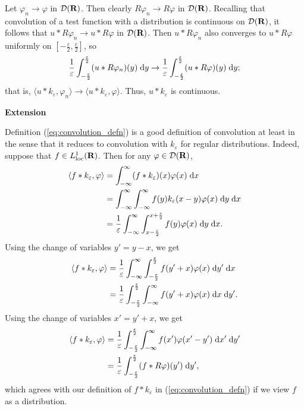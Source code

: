 \documentclass{homework}
\begin{document}
	Let $\varphi_n \to \varphi$ in $\mathcal{D}(\textnormal{\bf R})$. Then clearly $R\varphi_n \to R\varphi$ in $\mathcal{D}(\textnormal{\bf R})$. Recalling that convolution of a test function with a distribution is continuous on $\mathcal{D}(\textnormal{\bf R})$, it follows that $u * R\varphi_n \to u * R\varphi$ in $\mathcal{D}(\textnormal{\bf R})$. Then $u*R\varphi_n$ also converges to $u *R\varphi$ uniformly on $\left[-\frac{\varepsilon}{2}, \frac{\varepsilon}{2}\right]$, so
	\begin{equation}
		\frac{1}{\varepsilon}\int_{-\frac{\varepsilon}{2}}^\frac{\varepsilon}{2}(u*R\varphi_n)(y)\;\text{d} y \to 
		\frac{1}{\varepsilon}\int_{-\frac{\varepsilon}{2}}^\frac{\varepsilon}{2}(u*R\varphi)(y)\;\text{d} y;
	\end{equation}
	that is, $\langle u * k_\varepsilon, \varphi_n\rangle \to \langle u*k_\varepsilon, \varphi\rangle$. Thus, $u*k_\varepsilon$ is continuous.
	
	\textbf{Extension}
	
	Definition (\ref{eq:convolution_defn}) is a good definition of convolution at least in the sense that it reduces to convolution with $k_\varepsilon$ for regular distributions. Indeed, suppose that $f \in L^1_\text{loc}(\textnormal{\bf R})$. Then for any $\varphi \in \mathcal{D}(\textnormal{\bf R})$,
	\begin{align}
		\langle f * k_\varepsilon, \varphi\rangle &= \int_{-\infty}^\infty (f * k_\varepsilon)(x) \varphi(x) \;\text{d} x \\
		&= \int_{-\infty}^\infty \int_{-\infty}^\infty f(y) k_\varepsilon(x-y) \varphi(x)\;\text{d} y \;\text{d} x \\
		&= \frac{1}{\varepsilon}\int_{-\infty}^\infty \int_{x-\frac{\varepsilon}{2}}^{x+\frac{\varepsilon}{2}} f(y)\varphi(x)\;\text{d} y \;\text{d} x.
	\end{align}
	Using the change of variables $y' = y - x$, we get
	\begin{align}
			\langle f * k_\varepsilon, \varphi\rangle &= \frac{1}{\varepsilon}\int_{-\infty}^\infty \int_{-\frac{\varepsilon}{2}}^\frac{\varepsilon}{2} f(y' + x) \varphi(x) \;\text{d} y' \;\text{d} x \\
			&= \frac{1}{\varepsilon}\int_{-\frac{\varepsilon}{2}}^\frac{\varepsilon}{2} \int_{-\infty}^\infty f(y' + x) \varphi(x) \;\text{d} x \;\text{d} y'.
	\end{align}
	Using the change of variables $x' = y' + x$, we get
	\begin{align}
		\langle f * k_\varepsilon, \varphi\rangle &= \frac{1}{\varepsilon}\int_{-\frac{\varepsilon}{2}}^\frac{\varepsilon}{2} \int_{-\infty}^\infty f(x') \varphi(x'-y') \;\text{d} x' \;\text{d} y' \\
		&= \frac{1}{\varepsilon}\int_{-\frac{\varepsilon}{2}}^\frac{\varepsilon}{2} (f * R\varphi)(y')\;\text{d} y',
	\end{align}
	which agrees with our definition of $f * k_\varepsilon$ in (\ref{eq:convolution_defn}) if we view $f$ as a distribution.
	
\end{document}
